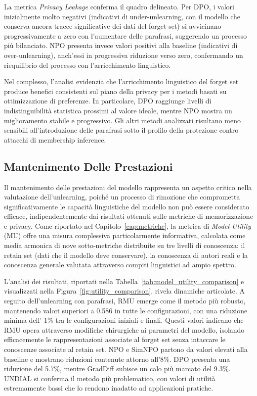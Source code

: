 La metrica \textit{Privacy Leakage} conferma il quadro delineato. Per DPO, i valori inizialmente molto negativi (indicativi di under-unlearning, con il modello che conserva ancora tracce significative dei dati del forget set) si avvicinano progressivamente a zero con l'aumentare delle parafrasi, suggerendo un processo più bilanciato. NPO presenta invece valori positivi alla baseline (indicativi di over-unlearning), anch'essi in progressiva riduzione verso zero, confermando un riequilibrio del processo con l'arricchimento linguistico.

Nel complesso, l’analisi evidenzia che l’arricchimento linguistico del forget set produce benefici consistenti sul piano della privacy per i metodi basati su ottimizzazione di preferenze. In particolare, DPO raggiunge livelli di indistinguibilità statistica prossimi al valore ideale, mentre NPO mostra un miglioramento stabile e progressivo. Gli altri metodi analizzati risultano meno sensibili all’introduzione delle parafrasi sotto il profilo della protezione contro attacchi di membership inference.

\subsection{Mantenimento Delle Prestazioni}

Il mantenimento delle prestazioni del modello rappresenta un aspetto critico nella valutazione dell'unlearning, poiché un processo di rimozione che comprometta significativamente le capacità linguistiche del modello non può essere considerato efficace, indipendentemente dai risultati ottenuti sulle metriche di memorizzazione e privacy. Come riportato nel Capitolo~\ref{cap:metriche}, la metrica di \textit{Model Utility} (MU) offre una misura complessiva particolarmente informativa, calcolata come media armonica di nove sotto-metriche distribuite su tre livelli di conoscenza: il retain set (dati che il modello deve conservare), la conoscenza di autori reali e la conoscenza generale valutata attraverso compiti linguistici ad ampio spettro.

L'analisi dei risultati, riportati nella Tabella~\ref{tab:model_utility_comparison} e visualizzati nella Figura~\ref{fig:utility_comparison}, rivela dinamiche articolate. A seguito dell'unlearning con parafrasi, RMU emerge come il metodo più robusto, mantenendo valori superiori a 0.586 in tutte le configurazioni, con una riduzione minima dell' 1\% tra le configurazioni iniziali e finali. Questi valori indicano che RMU opera attraverso modifiche chirurgiche ai parametri del modello, isolando efficacemente le rappresentazioni associate al forget set senza intaccare le conoscenze associate al retain set. NPO e SimNPO partono da valori elevati alla baseline e mostrano riduzioni contenute attorno all'8\%. DPO presenta una riduzione del 5.7\%, mentre GradDiff subisce un calo più marcato del 9.3\%. UNDIAL si conferma il metodo più problematico, con valori di utilità estremamente bassi che lo rendono inadatto ad applicazioni pratiche.


